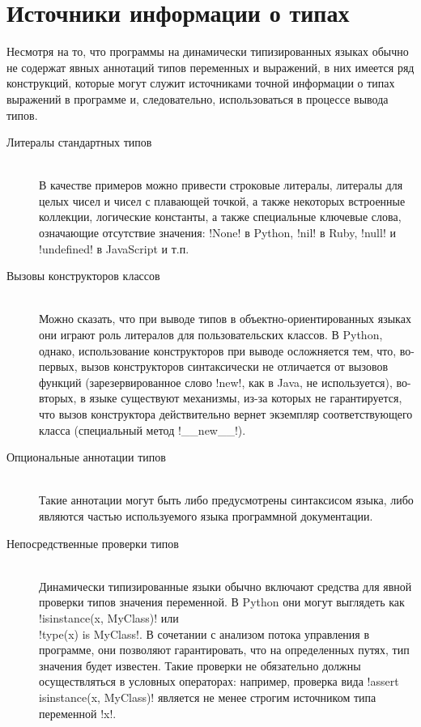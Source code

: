 \section{Источники информации о типах}
\label{sec:type-sources}

Несмотря на то, что программы на динамически типизированных языках обычно не
содержат явных аннотаций типов переменных и выражений, в них
имеется ряд конструкций, которые могут служит источниками точной информации о
типах выражений в программе и, следовательно, использоваться в процессе вывода
типов.

\begin{description}
    \item[Литералы стандартных типов] \hfill \\
        В качестве примеров можно привести
        строковые литералы, литералы для целых чисел и чисел с плавающей точкой,
        а также некоторых встроенные коллекции,
        логические константы, а также специальные ключевые слова, означающие
        отсутствие значения: !None! в Python, !nil! в Ruby,
        !null! и !undefined! в JavaScript и т.п.
        
    \item[Вызовы конструкторов классов] \hfill \\
        Можно сказать, что при выводе типов в объектно-ориентированных языках
        они играют роль литералов для пользовательских классов. В Python, однако,
        использование конструкторов при выводе осложняется тем, что, во-первых, вызов
        конструкторов синтаксически не отличается от вызовов функций
        (зарезервированное слово !new!, как в Java, не используется), во-вторых,
        в языке существуют механизмы, из-за которых не гарантируется, что вызов
        конструктора действительно вернет экземпляр соответствующего класса
        (специальный метод !__new__!).

    \item[Опциональные аннотации типов] \hfill \\
        Такие аннотации могут быть либо предусмотрены синтаксисом языка, либо
        являются частью используемого языка программной документации.

    \item[Непосредственные проверки типов] \hfill \\
        Динамически типизированные языки обычно включают средства для явной
        проверки типов значения переменной. В Python они могут
        выглядеть как !isinstance(x, MyClass)! или \\
        !type(x) is MyClass!. В
        сочетании с анализом потока управления в программе, они позволяют
        гарантировать, что на определенных путях, тип значения будет известен. 
        Такие проверки не обязательно должны осуществляться в условных
        операторах: например, проверка вида !assert isinstance(x, MyClass)!
        является не менее строгим источником типа переменной !x!.


\end{description}
